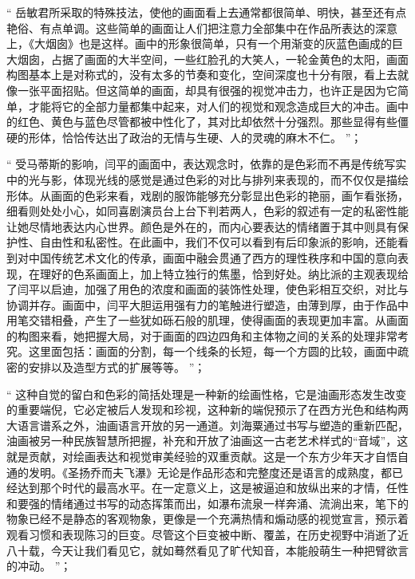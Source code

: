 \documentclass[master,oneside]{zjuthesis}
\begin{document}
“ 岳敏君所采取的特殊技法，使他的画面看上去通常都很简单、明快，甚至还有点艳俗、有点单调。这些简单的画面让人们把注意力全部集中在作品所表达的深意上，《大烟囱》也是这样。画中的形象很简单，只有一个用渐变的灰蓝色画成的巨大烟囱，占据了画面的大半空间，一些红脸孔的大笑人，一轮金黄色的太阳，画面构图基本上是对称式的，没有太多的节奏和变化，空间深度也十分有限，看上去就像一张平面招贴。但这简单的画面，却具有很强的视觉冲击力，也许正是因为它简单，才能将它的全部力量都集中起来，对人们的视觉和观念造成巨大的冲击。画中的红色、黄色与蓝色尽管都被中性化了，其对比却依然十分强烈。那些显得有些僵硬的形体，恰恰传达出了政治的无情与生硬、人的灵魂的麻木不仁。 ”；

“ 受马蒂斯的影响，闫平的画面中，表达观念时，依靠的是色彩而不再是传统写实中的光与影，体现光线的感觉是通过色彩的对比与排列来表现的，而不仅仅是描绘形体。从画面的色彩来看，戏剧的服饰能够充分彰显出色彩的艳丽，画乍看张扬，细看则处处小心，如同喜剧演员台上台下判若两人，色彩的叙述有一定的私密性能让她尽情地表达内心世界。颜色是外在的，而内心要表达的情绪置于其中则具有保护性、自由性和私密性。在此画中，我们不仅可以看到有后印象派的影响，还能看到对中国传统艺术文化的传承，画面中融会贯通了西方的理性秩序和中国的意向表现，在理好的色系画面上，加上特立独行的焦墨，恰到好处。纳比派的主观表现给了闫平以启迪，加强了用色的浓度和画面的装饰性处理，使色彩相互交织，对比与协调并存。画面中，闫平大胆运用强有力的笔触进行塑造，由薄到厚，由于作品中用笔交错相叠，产生了一些犹如砾石般的肌理，使得画面的表现更加丰富。从画面的构图来看，她把握大局，对于画面的四边四角和主体物之间的关系的处理非常考究。这里面包括：画面的分割，每一个线条的长短，每一个方圆的比较，画面中疏密的安排以及造型方式的扩展等等。 ”；

“ 这种自觉的留白和色彩的简括处理是一种新的绘画性格，它是油画形态发生改变的重要端倪，它必定被后人发现和珍视，这种新的端倪预示了在西方光色和结构两大语言谱系之外，油画语言开放的另一通道。刘海粟通过书写与塑造的重新匹配，油画被另一种民族智慧所把握，补充和开放了油画这一古老艺术样式的“音域”，这就是贡献，对绘画表达和视觉审美经验的双重贡献。这是一个东方少年天才自悟自通的发明。《圣扬乔而夫飞瀑》无论是作品形态和完整度还是语言的成熟度，都已经达到那个时代的最高水平。在一定意义上，这是被逼迫和放纵出来的才情，任性和要强的情绪通过书写的动态挥策而出，如瀑布流泉一样奔涌、流淌出来，笔下的物象已经不是静态的客观物象，更像是一个充满热情和煽动感的视觉宣言，预示着观看习惯和表现陈习的巨变。尽管这个巨变被中断、覆盖，在历史视野中消逝了近八十载，今天让我们看见它，就如蓦然看见了旷代知音，本能般萌生一种把臂欲言的冲动。 ”；
\end{document}
